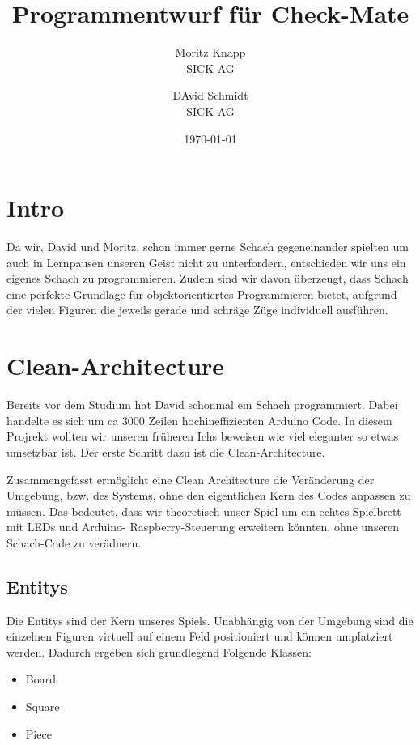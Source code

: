 \documentclass{article}
\title{Programmentwurf für Check-Mate}
\author{Moritz Knapp  \\
	SICK AG  \\
	\and 
	DAvid Schmidt \\
	SICK AG \\
	}
\date{\today}
\begin{document}
\maketitle

\tableofcontents
\newpage

\section{Intro}

Da wir, David und Moritz, schon immer gerne Schach gegeneinander spielten um auch in Lernpausen unseren Geist nicht zu unterfordern, entschieden wir uns ein eigenes Schach zu programmieren. 
Zudem sind wir davon überzeugt, dass Schach eine perfekte Grundlage für objektorientiertes Programmieren bietet, aufgrund der vielen Figuren die jeweils gerade und schräge Züge individuell ausführen.

\section{Clean-Architecture} \label{sec:cleanArc}
Bereits vor dem Studium hat David schonmal ein Schach programmiert. Dabei handelte es sich um ca 3000 Zeilen hochineffizienten Arduino Code. In diesem Projrekt wollten wir unseren früheren Ichs beweisen wie viel eleganter so etwas umsetzbar ist. Der erste Schritt dazu ist die Clean-Architecture.

Zusammengefasst ermöglicht eine Clean Architecture die Veränderung der Umgebung, bzw. des Systems, ohne den eigentlichen Kern des Codes anpassen zu müssen.
Das bedeutet, dass wir theoretisch unser Spiel um ein echtes Spielbrett mit LEDs und Arduino- Raspberry-Steuerung erweitern könnten, ohne unseren Schach-Code zu verädnern.

\subsection{Entitys}
Die Entitys sind der Kern unseres Spiels. Unabhängig von der Umgebung sind die einzelnen Figuren virtuell auf einem Feld positioniert und können umplatziert werden.
Dadurch ergeben sich grundlegend Folgende Klassen: 

\begin{center}
	\begin{itemize}
		\item Board
		\item Square
		\item Piece
	\end{itemize}
\end{center}
\end{document}
